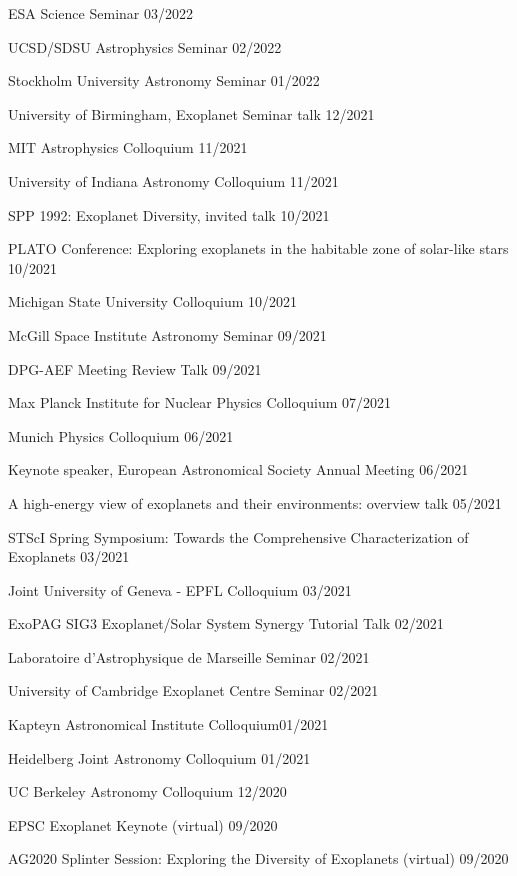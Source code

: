 \documentclass[12pt,letterpaper]{article}
\begin{document}
\begin{list}{}{\cvlist}
\item {ESA Science Seminar \hfill 03/2022}
\item {UCSD/SDSU Astrophysics Seminar \hfill 02/2022}
\item {Stockholm University Astronomy Seminar \hfill 01/2022}
\item {University of Birmingham, Exoplanet Seminar talk \hfill 12/2021}
\item {MIT Astrophysics Colloquium \hfill 11/2021}
\item {University of Indiana Astronomy Colloquium \hfill 11/2021}
\item {SPP 1992: Exoplanet Diversity, invited talk \hfill 10/2021}
\item {PLATO Conference: Exploring exoplanets in the habitable zone of solar-like stars \hfill 10/2021}
\item {Michigan State University Colloquium \hfill 10/2021}
\item {McGill Space Institute Astronomy Seminar \hfill 09/2021}
\item {DPG-AEF Meeting Review Talk \hfill  09/2021}
\item {Max Planck Institute for Nuclear Physics Colloquium \hfill 07/2021}
\item {Munich Physics Colloquium \hfill 06/2021}
\item {Keynote speaker, European Astronomical Society Annual Meeting \hfill 06/2021}
\item {A high-energy view of exoplanets and their environments: overview talk \hfill 05/2021}
\item {STScI Spring Symposium: Towards the Comprehensive Characterization of Exoplanets \hfill 03/2021}
\item {Joint University of Geneva - EPFL Colloquium \hfill 03/2021}
\item {ExoPAG SIG3 Exoplanet/Solar System Synergy Tutorial Talk \hfill 02/2021}
\item {Laboratoire d'Astrophysique de Marseille Seminar \hfill 02/2021}
\item {University of Cambridge Exoplanet Centre Seminar \hfill 02/2021}
\item {Kapteyn Astronomical Institute Colloquium\hfill 01/2021}
\item {Heidelberg Joint Astronomy Colloquium \hfill 01/2021}
\item {UC Berkeley Astronomy Colloquium \hfill 12/2020}
\item {EPSC Exoplanet Keynote (virtual) \hfill 09/2020}
\item {AG2020 Splinter Session: Exploring the Diversity of Exoplanets (virtual) \hfill 09/2020}

\end{list}
\end{document}
